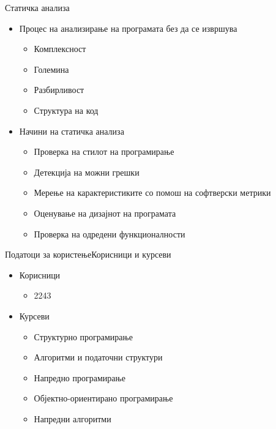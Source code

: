 \begin{frame}{Статичка анализа}
\begin{itemize}
  \item Процес на анализирање на програмата без да се извршува
  \begin{itemize}
      \item Комплексност
      \item Големина
      \item Разбирливост
      \item Структура на код
  \end{itemize}
  \item Начини на статичка анализа
  \begin{itemize}
      \item Проверка на стилот на програмирање
      \item Детекција на можни грешки
      \item Мерење на карактеристиките со помош на софтверски метрики
      \item Оценување на дизајнот на програмата
      \item Проверка на одредени функционалности
      \end{itemize}
\end{itemize}
\end{frame}


\begin{frame}{Податоци за користење}{Корисници и курсеви}
\begin{itemize}
  \item Корисници
  \begin{itemize}
    \item 2243
  \end{itemize}
  \item Курсеви
\begin{itemize}
  \item Структурно програмирање
  \item Алгоритми и податочни структури
  \item Напредно програмирање
  \item Објектно-ориентирано програмирање
  \item Напредни алгоритми
\end{itemize}
\end{itemize}
\end{frame}

